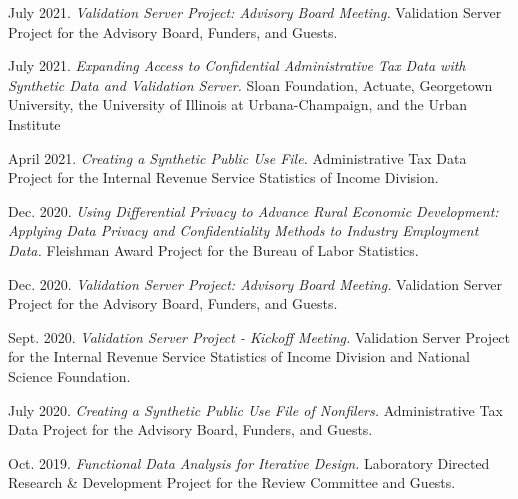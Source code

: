 \begin{etaremune}[topsep=0pt, itemsep=3pt, partopsep=0pt, parsep=0pt]
    \item July 2021. \textit{Validation Server Project: Advisory Board Meeting.} Validation Server Project for the Advisory Board, Funders, and Guests.
    
    \item July 2021. \textit{Expanding Access to Confidential Administrative Tax Data with Synthetic Data and Validation Server.} Sloan Foundation, Actuate, Georgetown University, the University of Illinois at Urbana-Champaign, and the Urban Institute
    
    \item April 2021. \textit{Creating a Synthetic Public Use File.} Administrative Tax Data Project for the Internal Revenue Service Statistics of Income Division.

    \item Dec. 2020. \textit{Using Differential Privacy to Advance Rural Economic Development: Applying Data Privacy and Confidentiality Methods to Industry Employment Data.} Fleishman Award Project for the Bureau of Labor Statistics.
    
    \item Dec. 2020. \textit{Validation Server Project: Advisory Board Meeting.} Validation Server Project for the Advisory Board, Funders, and Guests.
    
    \item Sept. 2020. \textit{Validation Server Project - Kickoff Meeting.} Validation Server Project for the Internal Revenue Service Statistics of Income Division and National Science Foundation.
    
    \item July 2020. \textit{Creating a Synthetic Public Use File of Nonfilers.} Administrative Tax Data Project for the Advisory Board, Funders, and Guests.
    
    \item Oct. 2019. \textit{Functional Data Analysis for Iterative Design.} Laboratory Directed Research \& Development Project for the Review Committee and Guests.
\end{etaremune}
